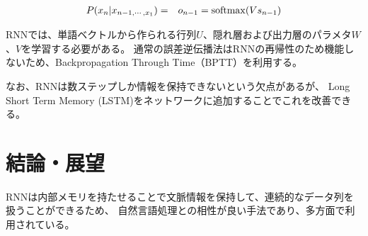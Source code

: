 \documentclass{jsarticle}
\begin{document}
\begin{eqnarray}
  \label{eq:eq8}
  P(x_n|x_{n-1,\cdots,x_1}) &=& o_{n-1} = {\rm softmax}(Vs_{n-1}) 
\end{eqnarray}

RNNでは、単語ベクトルから作られる行列$U$、隠れ層および出力層のパラメタ$W$、$V$を学習する必要がある。
通常の誤差逆伝播法はRNNの再帰性のため機能しないため、Backpropagation Through Time（BPTT）を利用する。

なお、RNNは数ステップしか情報を保持できないという欠点があるが、
Long Short Term Memory (LSTM)をネットワークに追加することでこれを改善できる。

\section{結論・展望}
RNNは内部メモリを持たせることで文脈情報を保持して、連続的なデータ列を扱うことができるため、
自然言語処理との相性が良い手法であり、多方面で利用されている。
\end{document}
